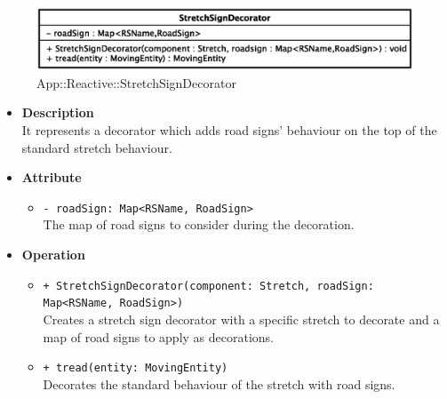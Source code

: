 \begin{figure}[h]
\centering
\includegraphics[scale=0.6,keepaspectratio]{images/solution/stretch_sign_decorator.eps}
\caption{App::Reactive::StretchSignDecorator}
\label{fig:sd-app-stretch_sign_decorator}
\end{figure}
\FloatBarrier
\begin{itemize}
  \item \textbf{Description} \\
    It represents a decorator which adds road signs' behaviour on the top of the
    standard stretch behaviour. 
  \item \textbf{Attribute}
  \begin{itemize}
    \item \texttt{- roadSign: Map<RSName, RoadSign>} \\
The map of road signs to consider during the decoration.
  \end{itemize}
  \item \textbf{Operation}
   \begin{itemize} 
   \item \texttt{+ StretchSignDecorator(component: Stretch, roadSign: Map<RSName, RoadSign>)} \\
Creates a stretch sign decorator with a specific stretch to decorate and a map of road signs to apply as decorations.
    \item \texttt{+ tread(entity: MovingEntity)} \\
Decorates the standard behaviour of the stretch with road signs.  
  \end{itemize}
\end{itemize}
